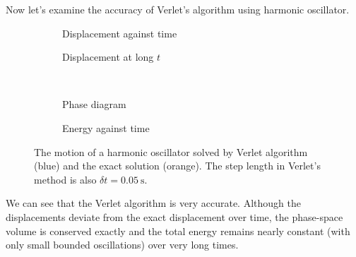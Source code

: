 \documentclass{article}
\theoremstyle{plain}\theoremheaderfont{\normalfont\itshape}\theorembodyfont{\rmfamily}\theoremseparator{.}\newtheorem*{rem}{Remark}\newtheorem*{ex}{Example}\newtheorem*{proof}{Proof}\newtheorem*{altp}{Alternative proof}
\theoremstyle{plain}\theoremheaderfont{\normalfont\bfseries}\theorembodyfont{\rmfamily}\theoremseparator{.}\newtheorem{thm}{Theorem}[section]\newtheorem{lem}[thm]{Lemma}\newtheorem{prop}[thm]{Proposition}\newtheorem*{cor}{Corollary}\newtheorem{defn}[thm]{Definition}\newtheorem{clm}[thm]{Claim}\newtheorem{clminproof}{Claim}\newtheorem{alg}[thm]{Algorithm}\newtheorem{hyp}[thm]{Hypothesis}\newtheorem{law}[thm]{Law}
\theoremstyle{break}\theoremheaderfont{\normalfont\itshape}\theorembodyfont{\rmfamily}\theoremseparator{.\medskip}\newtheorem*{proofskip}{Proof}\newtheorem*{exs}{Examples}\newtheorem*{rems}{Remarks}
\theoremstyle{break}\theoremheaderfont{\normalfont\bfseries}\theorembodyfont{\rmfamily}\theoremseparator{.\medskip}\newtheorem{lemskip}[thm]{Lemma}\newtheorem{defnskip}[thm]{Definition}\newtheorem{propskip}[thm]{Proposition}\newtheorem{thmskip}[thm]{Theorem}
\numberwithin{equation}{section}
\newcommand{\unit}[1]{\ \mathrm{#1}}
\begin{document}
    Now let's examine the accuracy of Verlet's algorithm using harmonic oscillator.

    \begin{figure}[ht!]
        \begin{subfigure}[h]{0.48\linewidth}
            \begin{adjustbox}{width=\linewidth}
            
            \end{adjustbox}
            \caption{Displacement against time}
        \end{subfigure}
        \hfill
        \begin{subfigure}[h]{0.48\linewidth}
            \begin{adjustbox}{width=\linewidth}
            
            \end{adjustbox}
            \caption{Displacement at long \(t\)}
        \end{subfigure}\\
        \vskip 0.5cm
        \begin{subfigure}[h]{0.48\linewidth}
            \begin{adjustbox}{width=\linewidth}
            
            \end{adjustbox}
            \caption{Phase diagram}
        \end{subfigure}
        \hfill
        \begin{subfigure}[h]{0.48\linewidth}
            \begin{adjustbox}{width=\linewidth}
            
            \end{adjustbox}
            \caption{Energy against time}
        \end{subfigure}%
        \caption{The motion of a harmonic oscillator solved by Verlet algorithm (blue) and the exact solution (orange). The step length in Verlet's method is also \(\delta t=0.05\unit{s}\).}
        \label{Fig:Verlet}
    \end{figure}

    We can see that the Verlet algorithm is very accurate. Although the displacements deviate from the exact displacement over time, the phase-space volume is conserved exactly and the total energy remains nearly constant (with only small bounded oscillations) over very long times.
\end{document}
